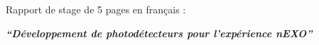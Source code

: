 \documentclass[a4paper, 12pt]{report}
\begin{document}
\vspace*{\fill}
\begin{center}
\begin{minipage}{.6\textwidth}
\begin{center}
  {Rapport de stage de 5 pages en français : \par}
  \vspace*{1cm}
  {\textbf{\large\itshape {``D\'eveloppement de photod\'etecteurs pour l'exp\'erience nEXO''}} \par}
\end{center}
  \end{minipage}
\end{center}
\vfill


\end{document}

